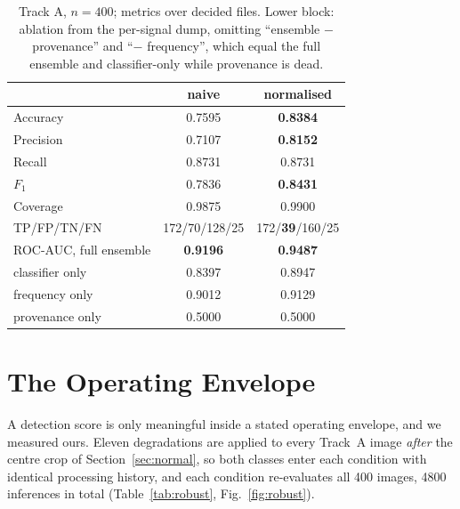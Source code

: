 \documentclass[conference]{IEEEtran}
\begin{document}
\begin{table}[t]
\caption{Track A, $n=400$; metrics over decided files. Lower block: ablation
from the per-signal dump, omitting ``ensemble $-$ provenance'' and ``$-$
frequency'', which equal the full ensemble and classifier-only while
provenance is dead.}
\label{tab:headline}
\centering
\small
\begin{tabular}{@{}lcc@{}}
\toprule
 & naive & normalised \\
\midrule
Accuracy    & 0.7595 & \textbf{0.8384} \\
Precision   & 0.7107 & \textbf{0.8152} \\
Recall      & 0.8731 & 0.8731 \\
$F_1$       & 0.7836 & \textbf{0.8431} \\
Coverage    & 0.9875 & 0.9900 \\
TP/FP/TN/FN & 172/70/128/25 & 172/\textbf{39}/160/25 \\
\midrule
ROC-AUC, full ensemble & \textbf{0.9196} & \textbf{0.9487} \\
\quad classifier only  & 0.8397 & 0.8947 \\
\quad frequency only   & 0.9012 & 0.9129 \\
\quad provenance only  & 0.5000 & 0.5000 \\
\bottomrule
\end{tabular}
\end{table}

\section{The Operating Envelope}
\label{sec:envelope}

A detection score is only meaningful inside a stated operating envelope, and
we measured ours. Eleven degradations are applied to every Track~A image
\emph{after} the centre crop of Section~\ref{sec:normal}, so both classes enter
each condition with identical processing history, and each condition re-evaluates
all 400 images, 4800 inferences in total (Table~\ref{tab:robust},
Fig.~\ref{fig:robust}).
\end{document}

